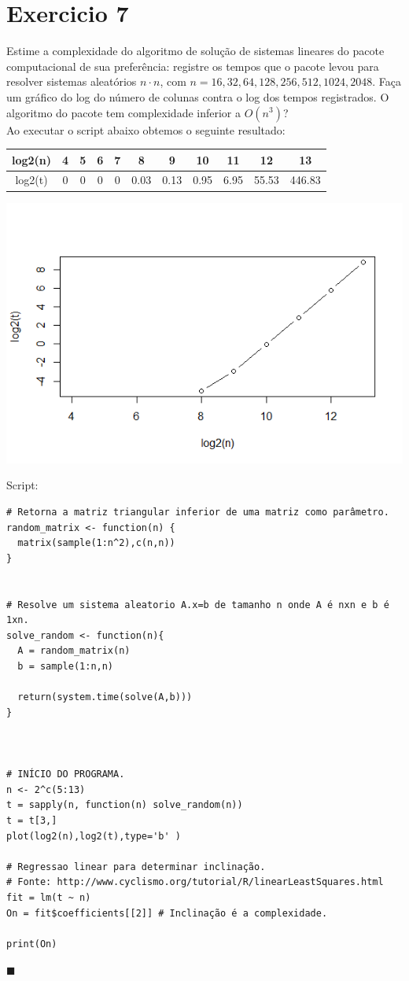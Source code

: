 \documentclass[12pt,a4paper]{article}
\newcommand{\qed}{\hfill $\blacksquare$}
\begin{document}
\newpage
\section*{Exercicio 7}
Estime a complexidade do algoritmo de solução de sistemas lineares do pacote computacional de sua
preferência: registre os tempos que o pacote levou para resolver sistemas aleatórios $ n \cdot n $, com $ n =
16,32,64,128,256,512,1024,2048 $. Faça um gráfico do log do número de colunas contra o log dos tempos
registrados. O algoritmo do pacote tem complexidade inferior a $ O(n^3) $?
\\

Ao executar o script abaixo obtemos o seguinte resultado:

\begin{tabular}{|c|c|c|c|c|c|c|c|c|c|c|}
\hline log2(n) & 4 & 5 & 6 & 7 & 8 & 9 & 10 & 11 & 12 & 13 \\ 
\hline log2(t) & 0 & 0 & 0 & 0 & 0.03 & 0.13 & 0.95 & 6.95 & 55.53 & 446.83\\ 
\hline 
\end{tabular} 

\includegraphics[width=0.8\linewidth]{./ex7}

Script:

\begin{verbatim}
# Retorna a matriz triangular inferior de uma matriz como parâmetro.
random_matrix <- function(n) {
  matrix(sample(1:n^2),c(n,n))
}


# Resolve um sistema aleatorio A.x=b de tamanho n onde A é nxn e b é 1xn.
solve_random <- function(n){
  A = random_matrix(n)
  b = sample(1:n,n)
  
  return(system.time(solve(A,b)))
}



# INÍCIO DO PROGRAMA.
n <- 2^c(5:13)
t = sapply(n, function(n) solve_random(n))
t = t[3,]
plot(log2(n),log2(t),type='b' )

# Regressao linear para determinar inclinação.
# Fonte: http://www.cyclismo.org/tutorial/R/linearLeastSquares.html
fit = lm(t ~ n)
On = fit$coefficients[[2]] # Inclinação é a complexidade.

print(On)
\end{verbatim}
\qed
\end{document}
